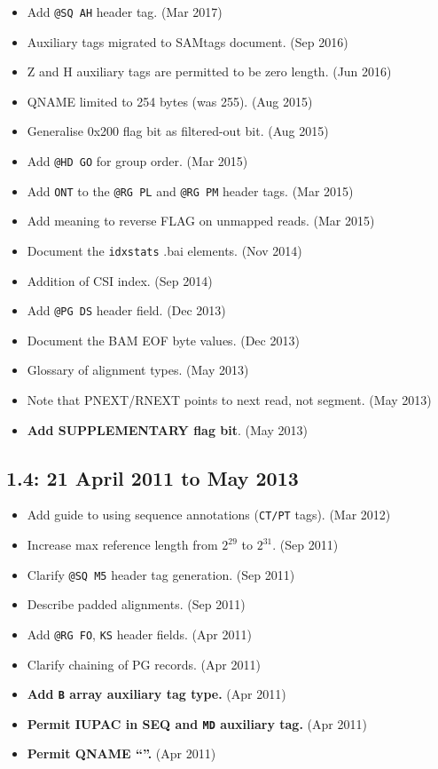 \documentclass[10pt]{article}
\begin{document}
\begin{appendices}
\begin{itemize}
\item Add {\tt @SQ AH} header tag. (Mar 2017)
\item Auxiliary tags migrated to SAMtags document. (Sep 2016)
\item Z and H auxiliary tags are permitted to be zero length. (Jun 2016)
\item QNAME limited to 254 bytes (was 255). (Aug 2015)
\item Generalise 0x200 flag bit as filtered-out bit. (Aug 2015)
\item Add {\tt @HD GO} for group order. (Mar 2015)
\item Add {\tt ONT} to the {\tt @RG PL} and {\tt @RG PM} header tags. (Mar 2015)
\item Add meaning to reverse FLAG on unmapped reads. (Mar 2015)
\item Document the {\tt idxstats} .bai elements. (Nov 2014)
\item Addition of CSI index. (Sep 2014)
\item Add {\tt @PG DS} header field. (Dec 2013)
\item Document the BAM EOF byte values. (Dec 2013)
\item Glossary of alignment types. (May 2013)
\item Note that PNEXT/RNEXT points to next read, not segment. (May 2013)
\item \textbf{Add SUPPLEMENTARY flag bit}. (May 2013)
\end{itemize}

\subsection*{1.4: 21 April 2011 to May 2013}

\begin{itemize}
\item Add guide to using sequence annotations ({\tt CT/PT} tags). (Mar 2012)
\item Increase max reference length from $2^{29}$ to $2^{31}$. (Sep
  2011)
\item Clarify {\tt @SQ M5} header tag generation. (Sep 2011)
\item Describe padded alignments. (Sep 2011)
\item Add {\tt @RG FO}, {\tt KS} header fields. (Apr 2011)
\item Clarify chaining of PG records. (Apr 2011)
\item \textbf{Add {\tt B} array auxiliary tag type.} (Apr 2011)\
\item \textbf{Permit IUPAC in SEQ and {\tt MD} auxiliary tag.} (Apr 2011)
\item \textbf{Permit QNAME ``{\tt *}''.} (Apr 2011)
\end{itemize}


\end{appendices}
\end{document}
